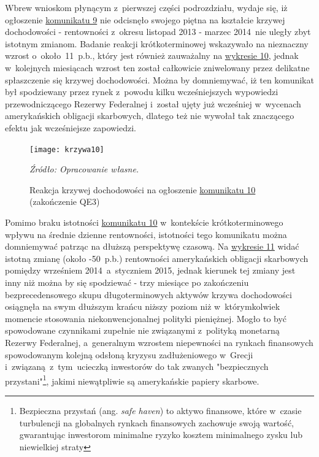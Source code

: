 Wbrew wnioskom płynącym z~pierwszej części podrozdziału, wydaje się, iż ogłoszenie \hyperlink{kom9}{komunikatu 9} nie odcisnęło swojego piętna na kształcie krzywej dochodowości - rentowności z~okresu listopad 2013 - marzec 2014~nie uległy zbyt istotnym zmianom. Badanie reakcji krótkoterminowej wskazywało na nieznaczny wzrost o~około~11~p.b., który jest również zauważalny na \hyperlink{fig11}{wykresie 10}, jednak w~kolejnych miesiącach wzrost ten został całkowicie zniwelowany przez delikatne spłaszczenie się krzywej dochodowości. Można by domniemywać, iż ten komunikat był spodziewany przez rynek z~powodu kilku wcześniejszych wypowiedzi przewodniczącego Rezerwy Federalnej i~został ujęty już wcześniej w~wycenach amerykańskich obligacji skarbowych, dlatego też nie wywołał tak znaczącego efektu jak wcześniejsze zapowiedzi.\\

\vspace{0.25cm}
\hypertarget{fig12}{}
\begin{figure}[h]
\begin{centering}
  \texttt{[image: krzywa10]}
    \captionsetup{format=hang}
    \caption{Reakcja krzywej dochodowości na ogłoszenie \protect\hyperlink{kom10}{komunikatu 10} (zakończenie QE3)}
\end{centering}
\begin{flushleft}
\hspace{1cm}\textit{\footnotesize{Źródło: Opracowanie własne.}} \\
\end{flushleft}
\vspace{-0.5cm}
\end{figure}

Pomimo braku istotności \hyperlink{kom10}{komunikatu 10} w~kontekście krótkoterminowego wpływu na średnie dzienne rentowności, istotności tego komunikatu można domniemywać patrząc na dłuższą perspektywę czasową. Na \hyperlink{fig12}{wykresie 11} widać istotną zmianę (około -50~p.b.) rentowności amerykańskich obligacji skarbowych pomiędzy wrześniem 2014~a~styczniem 2015, jednak kierunek tej zmiany jest inny niż można by się spodziewać -  trzy miesiące po zakończeniu bezprecedensowego skupu długoterminowych aktywów krzywa dochodowości osiągnęła na swym dłuższym krańcu niższy poziom niż w~którymkolwiek momencie stosowania niekonwencjonalnej polityki pieniężnej. Mogło to być spowodowane czynnikami zupełnie nie związanymi z~polityką monetarną Rezerwy Federalnej, a~generalnym wzrostem niepewności na rynkach finansowych spowodowanym kolejną odsłoną kryzysu zadłużeniowego w~Grecji i~związaną~z~tym~ucieczką inwestorów do tak zwanych "bezpiecznych przystani"\footnote{Bezpieczna przystań (ang. \textit{safe haven}) to aktywo finansowe, które w~czasie turbulencji na globalnych rynkach finansowych zachowuje swoją wartość, gwarantując inwestorom minimalne ryzyko kosztem minimalnego zysku lub niewielkiej straty}, jakimi niewątpliwie są amerykańskie papiery skarbowe.

